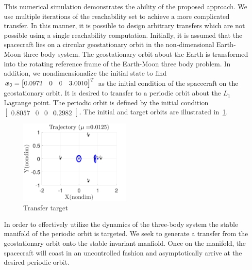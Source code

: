 \documentclass[smallcondensed]{svjour3}
\begin{document}
This numerical simulation demonstrates the ability of the proposed approach. 
We use multiple iterations of the reachability set to achieve a more complicated transfer.
In this manner, it is possible to design arbitrary transfers which are not possible using a single reachability computation.
Initially, it is assumed that the spacecraft lies on a circular geostationary orbit in the non-dimensional Earth-Moon three-body system. 
The geostationary orbit about the Earth is transformed into the rotating reference frame of the Earth-Moon three body problem.
In addition, we nondimensionalize the initial state to find \( \bm{x}_0 = \begin{bmatrix} 0.0972 & 0 & 0 & 3.0010\end{bmatrix}^T\) as the initial condition of the spacecraft on the geostationary orbit.
It is desired to transfer to a periodic orbit about the \( L_1 \) Lagrange point. 
The periodic orbit is defined by the initial condition \(\begin{bmatrix} 0.8057 & 0 & 0 & 0.2982 \end{bmatrix} \).
The initial and target orbits are illustrated in~\cref{fig:geo_transfer_target}.
\begin{figure}[htbp]
   \centering
   \includegraphics[width=0.5\textwidth]{initial_final} %
   \caption{Transfer target}
   \label{fig:geo_transfer_target}
\end{figure}
In order to effectively utilize the dynamics of the three-body system the stable manifold of the periodic orbit is targeted.
We seek to generate a transfer from the geostationary orbit onto the stable invariant manfiold.
Once on the manifold, the spacecraft will coast in an uncontrolled fashion and asymptotically arrive at the desired periodic orbit.
\end{document}
